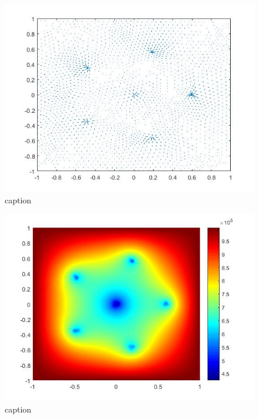 \documentclass[a4paper]{report}
\begin{document}
\begin{figure}[ht!]
	\centering
	\includegraphics[width=150mm]{2Dvarrows.jpg}
	\caption{caption
	\label{overflow}}
\end{figure}

\begin{figure}[ht!]
	\centering
	\includegraphics[width=150mm]{2Dvheat.jpg}
	\caption{caption
	\label{overflow}}
\end{figure}
\end{document}
